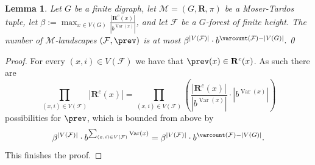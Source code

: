 \documentclass[12pt,a4paper]{article}
\numberwithin{equation}{section}
\newtheorem{lemma}[equation]{Lemma}
\theoremstyle{definition}
\newcommand{\be}{{\beta}}
\renewcommand{\cal}[1]{{\mathcal #1}}
\newcommand\Var{\operatorname{Var}}
\begin{document}
    \begin{lemma}\label{lem-count-landscapes}
    Let $G$ be a finite digraph, let $\cal M= (G,\mathbf R, \pi)$ be a Moser-Tardos tuple, let $\be := \max_{x\in V(G)} \frac{|\mathbf R^c(x)|}{|b^{\Var(x)}|}$, and let $\cal F$ be a $G$-forest of finite height. The number of $\cal M$-landscapes $(\cal F, \prev)$ is at most 
    $
        \be^{|V(\cal F)|}\cdot b^{\varcount(\cal  F) -|V(G)|}.
    $\qed
    \end{lemma}
    \begin{proof} For every $(x,i)\in V(\cal F)$ we have that $\prev(x)\in \mathbf R^c(x)$. As such there are 
    $$
    \prod_{(x,i)\in V(\cal F)} |\mathbf R^c(x)| = \prod_{(x,i)\in V(\cal F)} \left(\frac{|\mathbf R^c(x)|}{|b^{\Var(x)}|}\cdot |b^{\Var(x)}| \right) 
    $$
    possibilities for $\prev$, which is bounded from above by
    $$
    \be^{|V(\cal F)|} \cdot b^{\sum_{(x,i)\in V(\cal F)} \Var(x)} =\be^{|V(\cal F)|} \cdot b^{\varcount(\cal F)-|V(G)|}.
    $$
    This finishes the proof.
    \end{proof}
    
    
    
\end{document}
